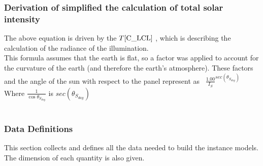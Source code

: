 \documentclass[12pt]{article}
\newcommand{\tref}[1]{T\ref{#1}}
\begin{document}

\subsubsection*{Derivation of simplified the calculation of total solar intensity}
		The above equation is driven by the $\tref{C_LCL} $ , which is describing the calculation of the radiance of the illumination.\\
		This formula assumes that the earth is flat, so a factor was applied to account for the curvature of the earth (and therefore the earth’s atmosphere). These factors and the angle of the sun with respect to the panel represent as \ $ \frac{1.00}{I_{S}}^ {sec(\theta_{S_{day}})}$\\
		Where $\frac{1}{\cos{\theta_{S_{day}}}}$ is $sec(\theta_{S_{day}})$\\

 

~\newline



\subsubsection{Data Definitions}\label{sec_datadef}

This section collects and defines all the data needed to build the instance
models. The dimension of each quantity is also given. 

~\newline
\end{document}
